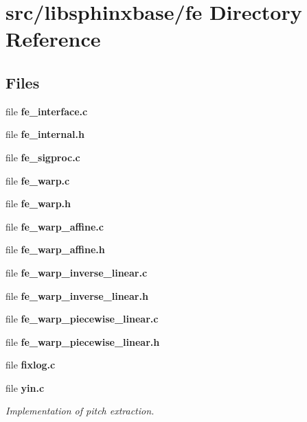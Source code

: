 \section{src/libsphinxbase/fe Directory Reference}
\label{dir_b1d999ee57d4a6d8d8bcab6209918fc2}
\subsection*{Files}
\begin{DoxyCompactItemize}
\item 
file {\bfseries fe\-\_\-interface.\-c}
\item 
file {\bfseries fe\-\_\-internal.\-h}
\item 
file {\bfseries fe\-\_\-sigproc.\-c}
\item 
file {\bfseries fe\-\_\-warp.\-c}
\item 
file {\bfseries fe\-\_\-warp.\-h}
\item 
file {\bfseries fe\-\_\-warp\-\_\-affine.\-c}
\item 
file {\bfseries fe\-\_\-warp\-\_\-affine.\-h}
\item 
file {\bfseries fe\-\_\-warp\-\_\-inverse\-\_\-linear.\-c}
\item 
file {\bfseries fe\-\_\-warp\-\_\-inverse\-\_\-linear.\-h}
\item 
file {\bfseries fe\-\_\-warp\-\_\-piecewise\-\_\-linear.\-c}
\item 
file {\bfseries fe\-\_\-warp\-\_\-piecewise\-\_\-linear.\-h}
\item 
file {\bfseries fixlog.\-c}
\item 
file {\bf yin.\-c}
\begin{DoxyCompactList}\small\item\em Implementation of pitch extraction. \end{DoxyCompactList}\end{DoxyCompactItemize}

